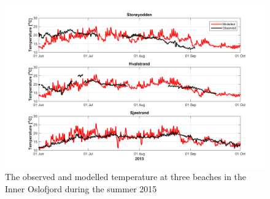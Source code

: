 \begin{figure}[ht]
\centerline{
\includegraphics*[trim=0 0 0 0,clip=true,width=\textwidth]{Figurer/badetemp_2015}
}
\caption{\small
The observed and modelled temperature at three beaches in the Inner Oslofjord during the summer 2015}
\label{fig:badetemp_2015}
\end{figure}


%
%


\clearpage 
